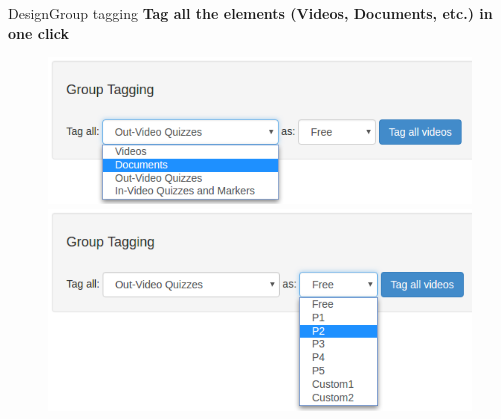 \documentclass[xcolor=table]{beamer}
\begin{document}
\begin{frame}{Design}{Group tagging}
\textbf{Tag all the elements (Videos, Documents, etc.) in one click}
	\begin{figure}
	\centering
	\includegraphics[width=0.6\linewidth]{media/gt1} \\
	\includegraphics[width=0.6\linewidth]{media/gt2}
	\label{fig:gt}
	\end{figure}
\end{frame}

%
%


%
\end{document}
